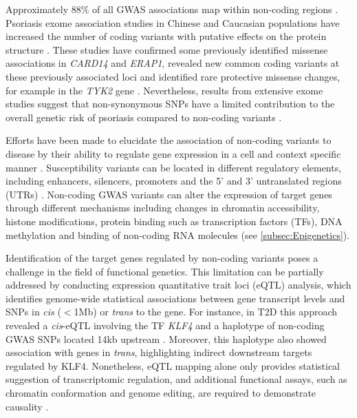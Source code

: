 Approximately 88\% of all GWAS associations map within non-coding regions \parencite{Welter2013}. Psoriasis exome association studies in Chinese and Caucasian populations have increased the number of coding variants with putative effects on the protein structure \parencite{Tang2014, Zuo2015, Dand2017}. These studies have confirmed some previously identified missense associations in \textit{CARD14} and \textit{ERAP1}, revealed new common coding variants at these previously associated loci and identified rare protective missense changes, for example in the \textit{TYK2} gene \parencite{Tang2014,Dand2017}. Nevertheless, results from extensive exome studies suggest that non-synonymous SNPs have a limited contribution to the overall genetic risk of psoriasis compared to non-coding variants \parencite{Tang2014}.

Efforts have been made to elucidate the association of non-coding variants to disease by their ability to regulate gene expression in a cell and context specific manner  \parencite{Fairfax2012, Fairfax2012, Naranbhai2015,Nica2011}. Susceptibility variants can be located in different regulatory elements, including enhancers, silencers, promoters and the 5' and 3' untranslated regions (UTRs)  \parencite{Ward2012}. Non-coding GWAS variants can alter the expression of target genes through different mechanisms including changes in chromatin accessibility, histone modifications, protein binding such as transcription factors (TFs), DNA methylation and binding of non-coding RNA molecules \parencite{Knight2014} (see \ref{subsec:Epigenetics}).

Identification of the target genes regulated by non-coding variants poses a challenge in the field of functional genetics. This limitation can be partially addressed by conducting expression quantitative trait loci (eQTL) analysis, which identifies genome-wide statistical associations between gene transcript levels and SNPs in \textit{cis} ($<$1Mb) or \textit{trans} to the gene. For instance, in T2D this approach revealed a \textit{cis}-eQTL involving the TF \textit{KLF4} and a haplotype of non-coding GWAS SNPs located 14kb upstream \parencite{Small2011}. Moreover, this haplotype also showed association with genes in \textit{trans}, highlighting indirect downstream targets regulated by KLF4. Nonetheless, eQTL mapping alone only provides statistical suggestion of transcriptomic regulation, and additional functional assays, such as chromatin conformation and genome editing, are required to demonstrate causality \parencite{Edwards2013}.  
 


